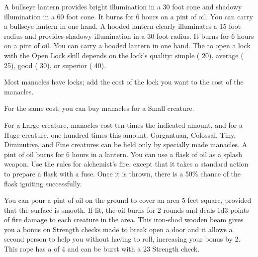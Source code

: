          A bullseye lantern provides bright illumination in a 30 foot cone and shadowy illumination in a 60 foot cone. It burns for 6 hours on a pint of oil. You can carry a bullseye lantern in one hand.
         A hooded lantern clearly illuminates a 15 foot radius and provides shadowy illumination in a 30 foot radius. It burns for 6 hours on a pint of oil. You can carry a hooded lantern in one hand.
         The  to open a lock with the Open Lock skill depends on the lock's quality: simple ( 20), average ( 25), good ( 30), or superior ( 40).
        \par Most manacles have locks; add the cost of the lock you want to the cost of the manacles.
        \par For the same cost, you can buy manacles for a Small creature.
        \par For a Large creature, manacles cost ten times the indicated amount, and for a Huge creature, one hundred times this amount. Gargantuan, Colossal, Tiny, Diminutive, and Fine creatures can be held only by specially made manacles.
         A pint of oil burns for 6 hours in a lantern. You can use a flask of oil as a splash weapon. Use the rules for alchemist's fire, except that it takes a standard action to prepare a flask with a fuse. Once it is thrown, there is a 50\% chance of the flask igniting successfully.
        \par You can pour a pint of oil on the ground to cover an area 5 feet square, provided that the surface is smooth. If lit, the oil burns for 2 rounds and deals 1d3 points of fire damage to each creature in the area.
         This iron-shod wooden beam gives you a  bonus on Strength checks made to break open a door and it allows a second person to help you without having to roll, increasing your bonus by 2.
         This rope has a  of 4 and can be burst with a  23 Strength check.
